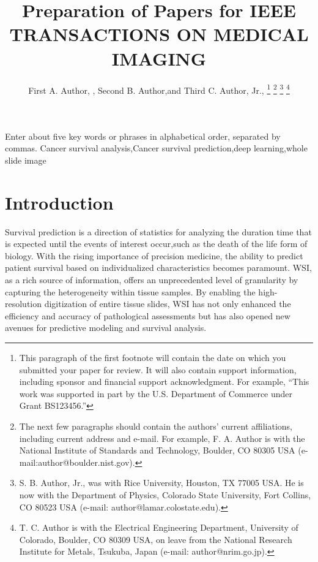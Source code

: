\documentclass[journal,twoside,web]{ieeecolor}
\begin{document}
\title{Preparation of Papers for IEEE TRANSACTIONS ON MEDICAL IMAGING}
\author{First A. Author, , Second B. Author,and Third C. Author, Jr., 
\thanks{This paragraph of the first footnote will contain the date on which
you submitted your paper for review. It will also contain support information,
including sponsor and financial support acknowledgment. For example, 
``This work was supported in part by the U.S. Department of Commerce under Grant BS123456.'' }
\thanks{The next few paragraphs should contain the authors' current affiliations,
including current address and e-mail. For example, F. A. Author is with the
National Institute of Standards and Technology, Boulder, CO 80305 USA (e-mail:author@boulder.nist.gov). }
\thanks{S. B. Author, Jr., was with Rice University, Houston, TX 77005 USA.
He is now with the Department of Physics, Colorado State University,
Fort Collins, CO 80523 USA (e-mail: author@lamar.colostate.edu).}
\thanks{T. C. Author is with the Electrical Engineering Department,
University of Colorado, Boulder, CO 80309 USA, on leave from the National
Research Institute for Metals, Tsukuba, Japan (e-mail: author@nrim.go.jp).}}

\maketitle

\begin{abstract}

\end{abstract}

\begin{IEEEkeywords}
Enter about five key words or phrases in alphabetical order, separated by commas.
Cancer survival analysis,Cancer survival prediction,deep learning,whole slide image
\end{IEEEkeywords}

\section{Introduction}
\label{sec:introduction}
Survival prediction is a direction of statistics for analyzing the duration time that is expected until the events of interest occur,such as the death of the life form of biology.
With the rising importance of precision medicine, the ability to predict patient survival based on individualized characteristics becomes paramount.  WSI, as a rich source of information, offers an unprecedented level of granularity by capturing the heterogeneity within tissue samples. By enabling the high-resolution digitization of entire tissue slides, WSI has not only enhanced the efficiency and accuracy of pathological assessments but has also opened new avenues for predictive modeling and survival analysis.
\end{document}
